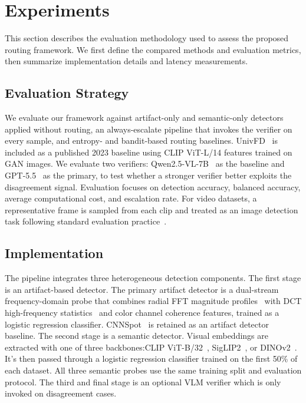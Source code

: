 \documentclass{ieeeaccess}
\begin{document}
\section{Experiments}

This section describes the evaluation methodology used to assess the proposed routing framework. We first define the compared methods and evaluation metrics, then summarize implementation details and latency measurements.

\subsection{Evaluation Strategy}
We evaluate our framework against artifact-only and semantic-only detectors applied without routing, an always-escalate pipeline that invokes the verifier on every sample, and entropy- and bandit-based routing baselines. UnivFD~\cite{ojha2023fakedetect} is included
as a published 2023 baseline using CLIP ViT-L/14 features trained on GAN images. We
evaluate two verifiers: Qwen2.5-VL-7B~\cite{bai2025qwen25vltechnicalreport} as the
baseline and GPT-5.5~\cite{openai2026gpt55} as the primary, to test whether a stronger verifier better exploits the disagreement signal.
Evaluation focuses on detection accuracy, balanced accuracy, 
average computational cost, and escalation rate. For video 
datasets, a representative frame is sampled from each clip 
and treated as an image detection task following standard 
evaluation practice~\cite{wen2025busterxmllmpoweredaigeneratedvideo}.



\subsection{Implementation}

The pipeline integrates three heterogeneous detection components. The first stage is an artifact-based detector. The primary artifact detector is a dual-stream frequency-domain probe that combines radial FFT magnitude profiles~\cite{dzanic2020fourier} with DCT high-frequency statistics~\cite{frank2020leveraging, Corvi_2023_ICASSP} and color channel
coherence features, trained as a logistic regression classifier. CNNSpot~\cite{wang2020cnn} is retained as an artifact detector baseline. The second stage is a semantic detector. Visual embeddings are extracted with one of three backbones:CLIP
ViT-B/32~\cite{pmlr-v139-radford21a}, SigLIP2~\cite{tschannen2025siglip2}, or
DINOv2~\cite{oquab2023dinov2}. It's then passed through a logistic regression classifier trained on the first 50\% of each dataset. All three semantic probes use the same training split and evaluation protocol. The third and final stage is an optional VLM verifier which is only invoked 
on disagreement cases.
\end{document}

